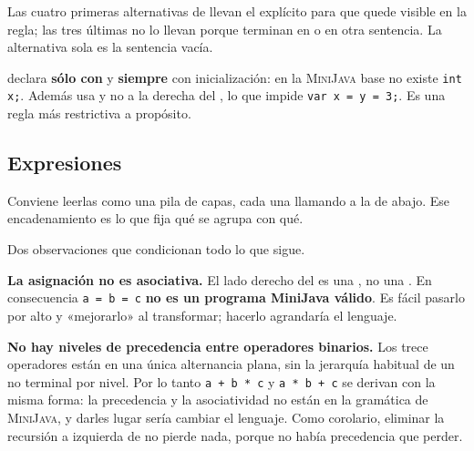 Las cuatro primeras alternativas de  llevan el \tl{;} explícito para que quede
visible en la regla; las tres últimas no lo llevan porque terminan en \tl{\}} o en otra sentencia.
La alternativa \tl{;} sola es la sentencia vacía.

 declara \textbf{sólo con}  y \textbf{siempre} con inicialización: en la
\textsc{MiniJava} base no existe \texttt{int x;}. Además usa  y no
 a la derecha del \tl{=}, lo que impide \texttt{var x = y = 3;}. Es una regla más
restrictiva a propósito.

\subsection{Expresiones}

Conviene leerlas como una pila de capas, cada una llamando a la de abajo. Ese encadenamiento es lo
que fija qué se agrupa con qué.

\begin{producciones}
\end{producciones}

Dos observaciones que condicionan todo lo que sigue.

\textbf{La asignación no es asociativa.} El lado derecho del \tl{=} es una ,
no una . En consecuencia \texttt{a = b = c} \textbf{no es un programa
MiniJava válido}. Es fácil pasarlo por alto y «mejorarlo» al transformar; hacerlo
agrandaría el lenguaje.

\textbf{No hay niveles de precedencia entre operadores binarios.} Los trece operadores están en una
única alternancia plana, sin la jerarquía habitual de un no terminal por nivel. Por lo tanto
\texttt{a + b * c} y \texttt{a * b + c} se derivan con la misma forma: la precedencia y la
asociatividad no están en la gramática de \textsc{MiniJava}, y darles lugar sería cambiar el
lenguaje. Como corolario, eliminar la recursión a izquierda de  no pierde
nada, porque no había precedencia que perder.

